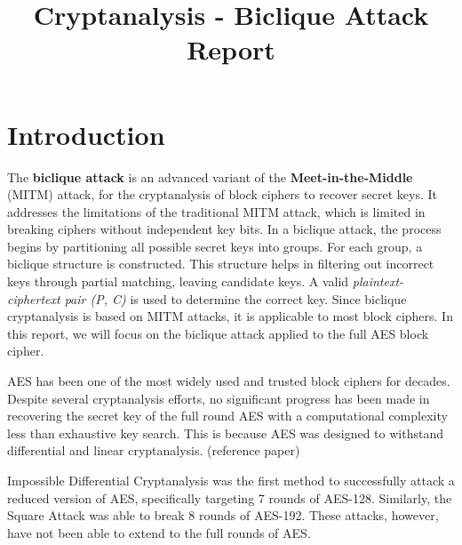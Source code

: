 \documentclass{report}
\title{Cryptanalysis - Biclique Attack Report} %
\begin{document}

\subject{INFO-F-537: Cryptanalysis} %




\buildmargins %
\buildcover %
\toc %


\section{Introduction}
The \textbf{biclique attack} is an advanced variant of the \textbf{Meet-in-the-Middle} (MITM) attack, for the cryptanalysis of block ciphers to recover secret keys. It addresses the limitations of the traditional MITM attack, which is limited in breaking ciphers without independent key bits. In a biclique attack, the process begins by partitioning all possible secret keys into groups. For each group, a biclique structure is constructed. This structure helps in filtering out incorrect keys through partial matching, leaving candidate keys. A valid \emph{plaintext-ciphertext pair (P, C)} is used to determine the correct key. Since biclique cryptanalysis is based on MITM attacks, it is applicable to most block ciphers. In this report, we will focus on the biclique attack applied to the full AES block cipher. 

AES has been one of the most widely used and trusted block ciphers for decades. Despite several cryptanalysis efforts, no significant progress has been made in recovering the secret key of the full round AES with a computational complexity less than exhaustive key search. This is because AES was designed to withstand differential and linear cryptanalysis. (reference paper) 

Impossible Differential Cryptanalysis was the first method to successfully attack a reduced version of AES, specifically targeting 7 rounds of AES-128. Similarly, the Square Attack was able to break 8 rounds of AES-192. These attacks, however, have not been able to extend to the full rounds of AES. 
\end{document}
